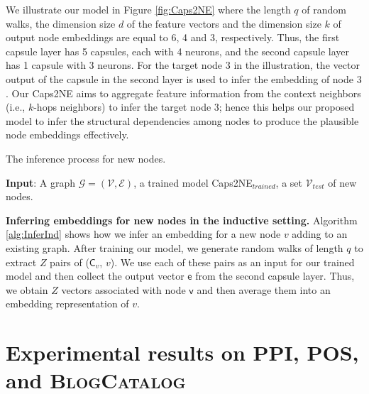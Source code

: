 \documentclass[sigconf]{acmart}
\begin{document}
We illustrate our model in Figure \ref{fig:Caps2NE} where the length $q$ of random walks, the dimension size $d$ of the feature vectors and the  dimension size $k$ of output node embeddings are equal to 6, 4 and 3, respectively. 
Thus, the first capsule layer has 5 capsules, each with 4 neurons, and the second capsule layer has 1 capsule with 3 neurons. 
For the target node $3$ in the illustration, the vector output of the capsule in the second layer is used to infer the embedding of node $3$.
Our Caps2NE aims to aggregate feature information from the context neighbors (i.e., $k$-hops neighbors) to infer the target node 3; hence this helps our proposed model to infer the structural dependencies among nodes to produce the plausible node embeddings effectively.


\begin{algorithm}
\caption{The inference process for new nodes.}
\label{alg:InferInd}
{
\DontPrintSemicolon
\SetAlgoVlined
\textbf{Input}: A graph $\mathcal{G} = (\mathcal{V}, \mathcal{E})$, a trained model Caps2NE$_{trained}$, a set $\mathcal{V}_{test}$ of new nodes.

}
\end{algorithm}

\textbf{Inferring embeddings for new nodes in the inductive setting.}
Algorithm \ref{alg:InferInd} shows how we infer an embedding for a new node $v$ adding to an existing graph. 
After training our model, we generate random walks of length $q$ to extract $Z$ pairs of ($\mathsf{C}_v$, $v$).
We use each of these pairs as an input for our trained model and then collect the output vector $\boldsymbol{\mathsf{e}}$ from the second capsule layer.
Thus, we obtain $Z$ vectors associated with node $\mathsf{v}$ and then average them into an embedding representation of $v$.

\section{Experimental results on PPI, POS, and \textsc{BlogCatalog}}
\end{document}
